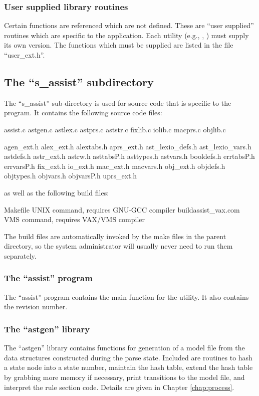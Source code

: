 \subsubsection{User supplied library routines}
\label{sec:usersupplied}
Certain functions are referenced which are not defined.   These
are ``user supplied'' routines which are specific to the application.
Each utility (e.g., , ) must supply its own
version.   The functions which must be supplied are listed in the file
``user\_ext.h''.
\subsection{The ``s\_assist'' subdirectory}

The ``s\_assist'' sub-directory
is used for source code that is specific to the  program.
It contains the following source code files:

\begin{codeexample}
assist.c
astgen.c
astlex.c
astprs.c
aststr.c
fixlib.c
iolib.c
macprs.c
objlib.c

agen_ext.h
alex_ext.h
alextabs.h
aprs_ext.h
ast_lexio_defs.h
ast_lexio_vars.h
astdefs.h
astr_ext.h
astrw.h
asttabsP.h
asttypes.h
astvars.h
booldefs.h
errtabsP.h
errvarsP.h
fix_ext.h
io_ext.h
mac_ext.h
macvars.h
obj_ext.h
objdefs.h
objtypes.h
objvars.h
objvarsP.h
uprs_ext.h
\end{codeexample}

as well as the following build files:
\begin{codeexample}
Makefile             {\scriptsize UNIX command, requires GNU-GCC compiler}
buildassist_vax.com  {\scriptsize VMS command, requires VAX/VMS compiler}
\end{codeexample}
The build files are automatically invoked by the make files in the
parent directory, so the system administrator will usually never need to
run them separately.

\subsubsection{The ``assist'' program}
\label{sec:assistmain}
The ``assist'' program contains the main function for the 
utility.  It also contains
the revision number.

\subsubsection{The ``astgen'' library}
\label{sec:astgen}
The ``astgen'' library contains functions for generation of a model file
from the data structures constructed during the parse state.   Included are
routines to hash a state node into a  state number, maintain
the hash table, extend the hash table by grabbing more memory if necessary,
print transitions to the model file, and interpret the rule section code.
Details are given in Chapter \ref{chap:process}.

